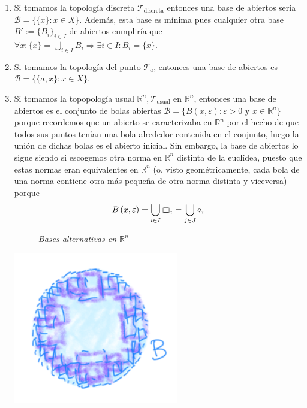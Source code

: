 \begin{ej}
\begin{enumerate}
    \item Si tomamos la topología discreta $\mathcal{T}_{\text{discreta}}$ entonces una base de abiertos sería $\mathcal{B} = \{\{x\} : x \in X\}$. Además, esta base es mínima pues cualquier otra base $B' := \{B_i\}_{i\in I}$ de abiertos cumpliría que $\forall x  : \{x\} = \bigcup_{i \in  I} B_i \Rightarrow \exists i \in I : B_i = \{x\}$.
    \item Si tomamos la topología del punto $\mathcal{T}_a$, entonces una base de abiertos es $\mathcal{B} = \{\{a, x\} : x \in X\}$.
    \item Si tomamos la topopología usual $\mathbb{R}^n, \mathcal{T}_{\text{usual}}$ en $\mathbb{R}^n$, entonces una base de abiertos es el conjunto de bolas abiertas $\mathcal{B} = \{B\left( x, \varepsilon \right) : \varepsilon > 0 \mbox{ y } x \in \mathbb{R}^n\}$ porque recordemos que un abierto se caracterizaba en $\mathbb{R}^n$ por el hecho de que todos sus puntos tenían una bola alrededor contenida en el conjunto, luego la unión de dichas bolas es el abierto inicial.
    Sin embargo, la base de abiertos lo sigue siendo si escogemos otra norma en $\mathbb{R}^n$ distinta de la euclídea, puesto que estas normas eran equivalentes en $\mathbb{R}^n$ (o, visto geométricamente, cada bola de una norma contiene otra más pequeña de otra norma distinta y viceversa)
    porque
    \[
    B\left( x, \varepsilon \right) = \bigcup_{i \in  I} \ooalign{$\sqsubset\mkern3mu$\cr$\mkern3mu\sqsupset$\cr}_i = \bigcup_{j \in J} \diamond_i
    \]
\begin{figure}[H]
    \centering
    \caption{\textit{Bases alternativas en $\mathbb{R}^n$}}
    \label{fig:bases-alternativas-en-rn}
\end{figure}
    \begin{center}
        \includegraphics[scale=0.3]{images/base_rn} 
    \end{center}
\end{enumerate}
\end{ej}

